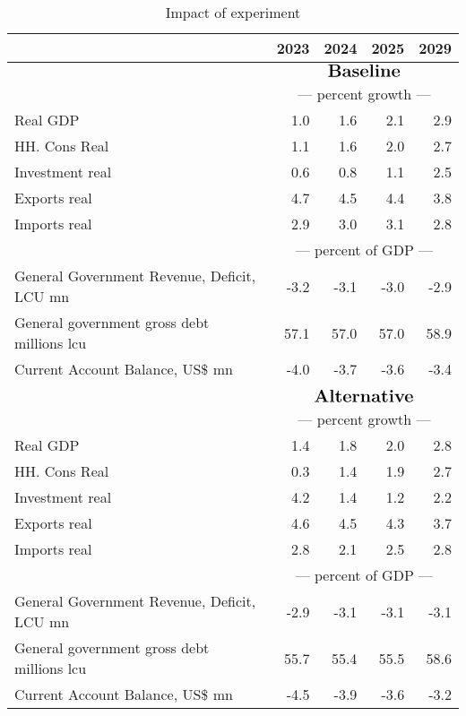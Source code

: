 \documentclass{article}
\begin{document}
\begin{table}[ht]
\caption{Impact of experiment}
\begin{tabular}{lrrr|r}
\toprule
 & 2023 & 2024 & 2025 & 2029 \\
\midrule
&\multicolumn{4}{c}{{$\Large \textbf{Baseline}$}}                                         \\
&\multicolumn{4}{c}{{---  percent growth ---}}                                         \\
Real GDP & 1.0 & 1.6 & 2.1 & 2.9 \\
HH. Cons Real & 1.1 & 1.6 & 2.0 & 2.7 \\
Investment real & 0.6 & 0.8 & 1.1 & 2.5 \\
Exports real & 4.7 & 4.5 & 4.4 & 3.8 \\
Imports real & 2.9 & 3.0 & 3.1 & 2.8 \\
&\multicolumn{4}{c}{{---  percent of GDP ---}}                                         \\
General Government Revenue, Deficit, LCU mn & -3.2 & -3.1 & -3.0 & -2.9 \\
General government gross debt millions lcu & 57.1 & 57.0 & 57.0 & 58.9 \\
Current Account Balance, US\$ mn & -4.0 & -3.7 & -3.6 & -3.4 \\
&\multicolumn{4}{c}{{ }}                                         \\
&\multicolumn{4}{c}{{$\Large \textbf{Alternative}$}}                                         \\
&\multicolumn{4}{c}{{---  percent growth ---}}                                         \\
Real GDP & 1.4 & 1.8 & 2.0 & 2.8 \\
HH. Cons Real & 0.3 & 1.4 & 1.9 & 2.7 \\
Investment real & 4.2 & 1.4 & 1.2 & 2.2 \\
Exports real & 4.6 & 4.5 & 4.3 & 3.7 \\
Imports real & 2.8 & 2.1 & 2.5 & 2.8 \\
&\multicolumn{4}{c}{{---  percent of GDP ---}}                                         \\
General Government Revenue, Deficit, LCU mn & -2.9 & -3.1 & -3.1 & -3.1 \\
General government gross debt millions lcu & 55.7 & 55.4 & 55.5 & 58.6 \\
Current Account Balance, US\$ mn & -4.5 & -3.9 & -3.6 & -3.2 \\

\end{tabular}
\end{table}
\end{document}
